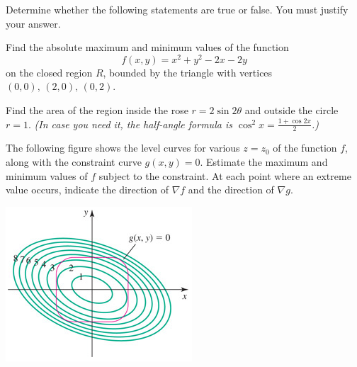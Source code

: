\documentclass[12pt, addpoints]{exam/exam}
\newcommand{\vstr}{\vspace{\stretch{1}}}
\theoremstyle{plain}
\begin{document}
\begin{questions}
\thispagestyle{headandfoot}

\question %
Determine whether the following statements are true or false.  You must justify your answer.

\newpage
\question[12] %
Find the absolute maximum and minimum values of the function 
\[
f(x,y)=x^2+y^2-2x-2y
\]
on the closed region $R$, bounded by the triangle with vertices $(0,0),\,(2,0),\,(0,2)$.

\newpage
\question[10] %
Find the area of the region inside the rose 
$r=2\sin{2\theta}$
and outside the circle 
$r=1$.  
\textit{(In case you need it, the half-angle formula is $\cos^2{x}=\frac{1+\cos{2x}}{2}$.)}  

\newpage
\question[8] %
The following figure shows the level curves for various $z=z_0$ of the function $f$, along with the constraint curve $g(x,y)=0$.  Estimate the maximum and minimum values of $f$ subject to the constraint.  At each point where an extreme value occurs, indicate the direction of $\nabla f$ and the direction of $\nabla g$.

\begin{center}
\includegraphics[scale=1.1]{12-9Exam2}
\end{center}
\vstr


\end{questions}
\end{document}
